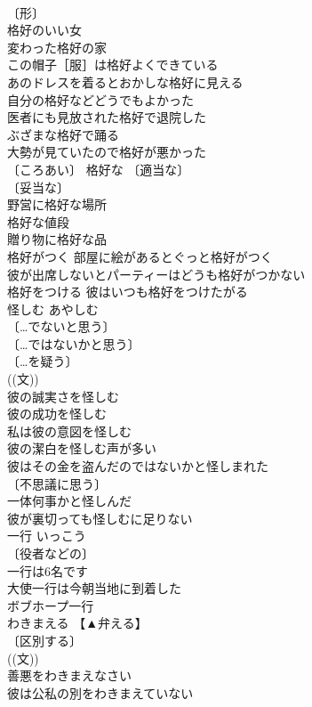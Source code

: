\documentclass[8pt]{extreport}
\begin{document}
\begin{CJK}{UTF8}{min}
\\	〔形〕
\\	格好のいい女 
\\	変わった格好の家 
\\	この帽子［服］は格好よくできている 
\\	あのドレスを着るとおかしな格好に見える 
\\	自分の格好などどうでもよかった 
\\	医者にも見放された格好で退院した 
\\	ぶざまな格好で踊る 
\\	大勢が見ていたので格好が悪かった 
\\	〔ころあい〕 格好な 〔適当な〕
\\	〔妥当な〕
\\	野営に格好な場所 
\\	格好な値段 
\\	贈り物に格好な品 
\\	格好がつく 部屋に絵があるとぐっと格好がつく 
\\	彼が出席しないとパーティーはどうも格好がつかない 
\\	格好をつける 彼はいつも格好をつけたがる 
\\	怪しむ	あやしむ	
\\	〔…でないと思う〕
\\	〔…ではないかと思う〕
\\	〔…を疑う〕
\\	((文)) 
\\	彼の誠実さを怪しむ 
\\	彼の成功を怪しむ 
\\	私は彼の意図を怪しむ 
\\	彼の潔白を怪しむ声が多い 
\\	彼はその金を盗んだのではないかと怪しまれた 
\\	〔不思議に思う〕
\\	一体何事かと怪しんだ 
\\	彼が裏切っても怪しむに足りない 
\\	一行	いっこう	
\\	〔役者などの〕
\\	一行は6名です 
\\	大使一行は今朝当地に到着した 
\\	ボブホープ一行 
\\	わきまえる	【▲弁える】	
\\	〔区別する〕
\\	((文)) 
\\	善悪をわきまえなさい 
\\	彼は公私の別をわきまえていない 

\end{CJK}
\end{document}

